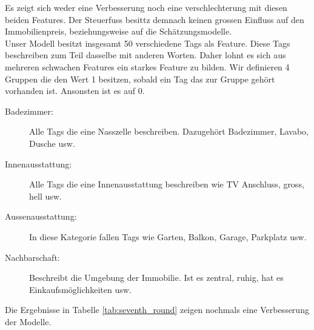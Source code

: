 \begin{table}[ht]
\centering
{}
\caption{Ergebnisse mit Einbezug des Steuerfuss}
\label{tab:sixth_round}
\end{table}

Es zeigt sich weder eine Verbesserung noch eine verschlechterung mit diesen beiden Features. Der Steuerfuss besittz demnach keinen grossen Einfluss auf den Immobilienpreis, beziehungsweise auf die Schätzungsmodelle.\\[2ex]
%
Unser Modell besitzt insgesamt 50 verschiedene Tags als Feature. Diese Tags beschreiben zum Teil dasselbe mit anderen Worten. Daher lohnt es sich aus mehreren schwachen Features ein starkes Feature zu bilden. Wir definieren 4 Gruppen die den Wert 1 besitzen, sobald ein Tag das zur Gruppe gehört vorhanden ist. Ansonsten ist es auf 0.

\begin{description}
\item[Badezimmer:] Alle Tags die eine Nasszelle beschreiben. Dazugehört Badezimmer, Lavabo, Dusche usw.
\item[Innenausstattung:] Alle Tags die eine Innenausstattung beschreiben wie TV Anschluss, gross, hell usw.
\item[Aussenausstattung:] In diese Kategorie fallen Tags wie Garten, Balkon, Garage, Parkplatz usw.
\item[Nachbarschaft:] Beschreibt die Umgebung der Immobilie. Ist es zentral, ruhig, hat es Einkaufsmöglichkeiten usw.
\end{description}

Die Ergebnisse in Tabelle \ref{tab:seventh_round} zeigen nochmals eine Verbesserung der Modelle.

\begin{table}[ht]
\centering
{}
\caption{Ergebnisse mit gruppierten Tags}
\label{tab:seventh_round}
\end{table}

